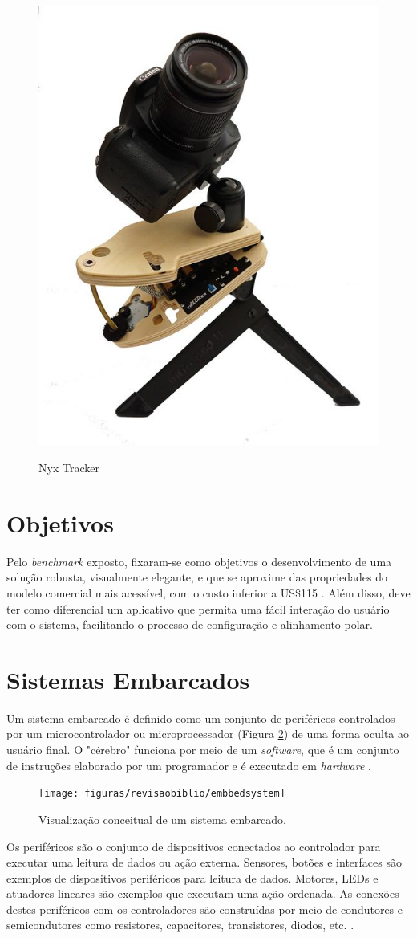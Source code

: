 \begin{figure}[h]
	\centering
	\caption{Nyx Tracker}
	\includegraphics[width=0.3\linewidth]{figuras/revisaobiblio/nyxtracker}
	\label{fig:nyxtracker}
\end{figure}


\section{Objetivos}

Pelo \textit{benchmark} exposto, fixaram-se como objetivos o desenvolvimento de uma solução robusta, visualmente elegante, e que se aproxime das propriedades do modelo comercial mais acessível, com o custo inferior a US\$115 . Além disso, deve ter como diferencial um aplicativo que permita uma fácil interação do usuário com o sistema, facilitando o processo de configuração e alinhamento polar.

\section{Sistemas Embarcados}

Um sistema embarcado é definido como um conjunto de periféricos controlados por um microcontrolador ou microprocessador (Figura \ref{fig:embbedsystem}) de uma forma oculta ao usuário final. O "cérebro" funciona por meio de um \textit{software}, que é um conjunto de instruções elaborado por um programador e é executado em \textit{hardware} \cite{book:ANSIC}.

\begin{figure}[!htb]
	\centering
	\caption{Visualização conceitual de um sistema embarcado.}
	\texttt{[image: figuras/revisaobiblio/embbedsystem]}
	\label{fig:embbedsystem}
\end{figure}

Os periféricos são o conjunto de dispositivos conectados ao controlador para executar uma leitura de dados ou ação externa. Sensores, botões e interfaces são exemplos de dispositivos periféricos para leitura de dados. Motores, LEDs e atuadores lineares são exemplos que executam uma ação ordenada. As conexões destes periféricos com os controladores são construídas por meio de condutores e semicondutores como resistores, capacitores, transistores, diodos, etc. \cite{book:ANSIC}. 


